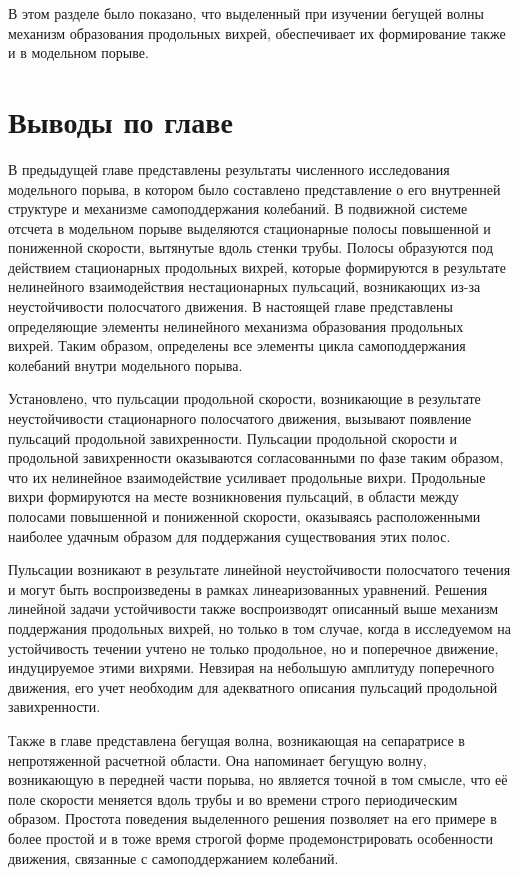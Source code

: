 В этом разделе было показано, что выделенный при изучении бегущей волны механизм образования продольных вихрей, обеспечивает их формирование также и в модельном порыве. 


\section{Выводы по главе}

В предыдущей главе представлены результаты численного исследования модельного порыва, в котором было составлено представление о его внутренней структуре и механизме самоподдержания колебаний. В подвижной системе отсчета в модельном порыве выделяются стационарные полосы повышенной и пониженной скорости, вытянутые вдоль стенки трубы. Полосы образуются под действием стационарных продольных вихрей, которые формируются в результате нелинейного взаимодействия нестационарных пульсаций, возникающих из-за неустойчивости полосчатого движения. В настоящей главе представлены определяющие элементы нелинейного механизма образования продольных вихрей. Таким образом, определены все элементы цикла самоподдержания колебаний внутри модельного порыва. 

Установлено, что пульсации продольной скорости, возникающие в результате неустойчивости стационарного полосчатого движения, вызывают появление пульсаций продольной завихренности. Пульсации продольной скорости и продольной завихренности оказываются согласованными по фазе таким образом, что их нелинейное взаимодействие усиливает продольные вихри. Продольные вихри формируются на месте возникновения пульсаций, в области между полосами повышенной и пониженной скорости, оказываясь расположенными наиболее удачным образом для поддержания существования этих полос.

Пульсации возникают в результате линейной неустойчивости полосчатого течения и могут быть воспроизведены в рамках линеаризованных уравнений. Решения линейной задачи устойчивости также воспроизводят описанный выше механизм поддержания продольных вихрей, но только в том случае, когда в исследуемом на устойчивость течении учтено не только продольное, но и поперечное движение, индуцируемое этими вихрями. Невзирая на небольшую амплитуду поперечного движения, его учет необходим для адекватного описания пульсаций продольной завихренности. 

Также в главе представлена бегущая волна, возникающая на сепаратрисе в непротяженной расчетной области. Она напоминает бегущую волну, возникающую в передней части порыва, но является точной в том смысле, что её поле скорости меняется вдоль трубы и во времени строго периодическим образом. Простота поведения выделенного решения позволяет на его примере в более простой и в тоже время строгой форме продемонстрировать особенности движения, связанные с самоподдержанием колебаний.

